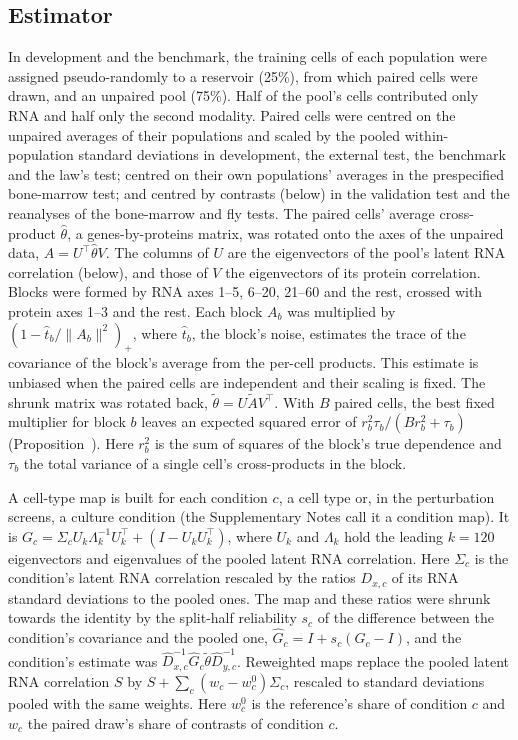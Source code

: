 \documentclass[pdflatex,sn-vancouver-num,iicol]{sn-jnl}
\begin{document}
\subsection{Estimator}
In development and the benchmark, the training cells of each population were assigned pseudo-randomly to a reservoir (25\%), from which paired cells were drawn, and an unpaired pool (75\%). Half of the pool's cells contributed only RNA and half only the second modality. Paired cells were centred on the unpaired averages of their populations and scaled by the pooled within-population standard deviations in development, the external test, the benchmark and the law's test; centred on their own populations' averages in the prespecified bone-marrow test; and centred by contrasts (below) in the validation test and the reanalyses of the bone-marrow and fly tests. The paired cells' average cross-product $\hat\theta$, a genes-by-proteins matrix, was rotated onto the axes of the unpaired data, $A=U^\top\hat\theta V$. The columns of $U$ are the eigenvectors of the pool's latent RNA correlation (below), and those of $V$ the eigenvectors of its protein correlation. Blocks were formed by RNA axes 1--5, 6--20, 21--60 and the rest, crossed with protein axes 1--3 and the rest. Each block $A_b$ was multiplied by $(1-\hat t_b/\|A_b\|^2)_+$, where $\hat t_b$, the block's noise, estimates the trace of the covariance of the block's average from the per-cell products. This estimate is unbiased when the paired cells are independent and their scaling is fixed. The shrunk matrix was rotated back, $\tilde\theta=U\tilde AV^\top$. With $B$ paired cells, the best fixed multiplier for block $b$ leaves an expected squared error of $r_b^2\tau_b/(Br_b^2+\tau_b)$ (Proposition~). Here $r_b^2$ is the sum of squares of the block's true dependence and $\tau_b$ the total variance of a single cell's cross-products in the block.

A cell-type map is built for each condition $c$, a cell type or, in the perturbation screens, a culture condition (the Supplementary Notes call it a condition map). It is $G_c=\Sigma_cU_k\Lambda_k^{-1}U_k^\top+(I-U_kU_k^\top)$, where $U_k$ and $\Lambda_k$ hold the leading $k=120$ eigenvectors and eigenvalues of the pooled latent RNA correlation. Here $\Sigma_c$ is the condition's latent RNA correlation rescaled by the ratios $D_{x,c}$ of its RNA standard deviations to the pooled ones. The map and these ratios were shrunk towards the identity by the split-half reliability $s_c$ of the difference between the condition's covariance and the pooled one, $\hat G_c=I+s_c(G_c-I)$, and the condition's estimate was $\hat D_{x,c}^{-1}\hat G_c\tilde\theta\hat D_{y,c}^{-1}$. Reweighted maps replace the pooled latent RNA correlation $S$ by $S+\sum_c(w_c-w^0_c)\Sigma_c$, rescaled to standard deviations pooled with the same weights. Here $w^0_c$ is the reference's share of condition $c$ and $w_c$ the paired draw's share of contrasts of condition $c$.
\end{document}
